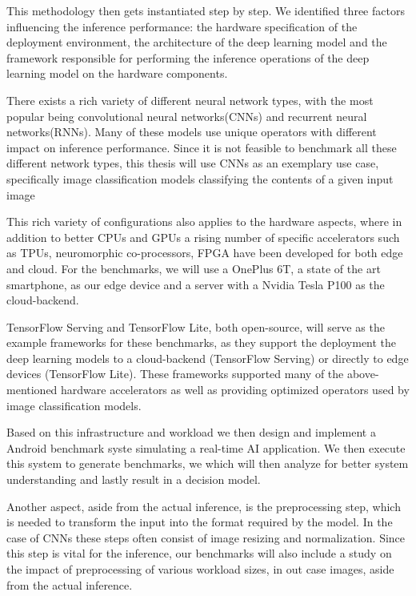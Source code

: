 This methodology then gets instantiated step by step.
We identified three factors influencing the inference performance: the hardware specification of the deployment environment, the architecture of the deep learning model and the framework responsible for performing the inference operations of the deep learning model on the hardware components.

There exists a rich variety of different neural network types, with the most popular being convolutional neural networks(CNNs) and recurrent neural networks(RNNs).
Many of these models use unique operators with different impact on inference performance.
Since it is not feasible to benchmark all these different network types, this thesis will use CNNs as an exemplary use case, specifically image classification models classifying the contents of a given input image

This rich variety of configurations also applies to the hardware aspects, where in addition to better CPUs and GPUs a rising number of specific accelerators such as TPUs, neuromorphic co-processors, FPGA have been developed for both edge and cloud.
For the benchmarks, we will use a OnePlus 6T, a state of the art smartphone, as our edge device and a server with a Nvidia Tesla P100 as the cloud-backend.

TensorFlow Serving and TensorFlow Lite, both open-source, will serve as the example frameworks for these benchmarks, as they support the deployment the deep learning models to a cloud-backend (TensorFlow Serving) or directly to edge devices (TensorFlow Lite). These frameworks supported many of the above-mentioned hardware accelerators as well as providing optimized operators used by image classification models.

Based on this infrastructure and workload we then design and implement a Android benchmark syste simulating a real-time AI application.
We then execute this system to generate benchmarks, we which will then analyze for better system understanding and lastly result in a decision model.

Another aspect, aside from the actual inference, is the preprocessing step, which is needed to transform the input into the format required by the model. 
In the case of CNNs these steps often consist of image resizing and normalization.
Since this step is vital for the inference, our benchmarks will also include a study on the impact of preprocessing of various workload sizes, in out case images, aside from the actual inference.

